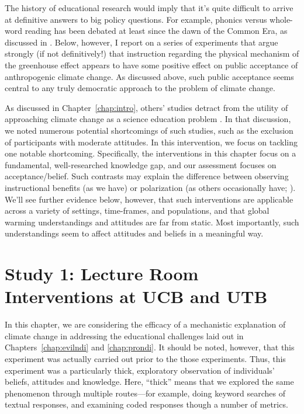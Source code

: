 The history of educational research would imply that it’s quite difficult to
arrive at definitive answers to big policy questions. For example, phonics
versus
whole-word reading has been debated at least since the dawn of the Common Era,
as discussed in \textcite{compayre_history_1889}. Below, however, I report
on a series of experiments that argue strongly (if not definitively!) that
instruction regarding the physical mechanism of the greenhouse effect appears to
have some positive effect on public acceptance of anthropogenic climate change.
As discussed above, such public acceptance seems central to any truly democratic
approach to the problem of climate change.

As discussed in Chapter~\ref{chap:intro}, others’ studies detract from the
utility of approaching climate change as a science education problem
\parencite[e.g.,]{lord_biased_1979,kahan_polarizing_2012}. In that discussion,
we noted numerous potential shortcomings of such studies, such as the exclusion
of participants with moderate attitudes. In this intervention, we focus on
tackling one notable shortcoming. Specifically, the interventions in this chapter 
focus on a fundamental, well-researched knowledge gap, and our assessment
focuses on acceptance/belief.  Such contrasts may explain the difference between
observing instructional benefits (as we have) or polarization (as others
occasionally have; ).  We'll see further evidence
below, however, that such interventions are applicable across a variety of
settings, time-frames, and populations, and that global warming understandings
and attitudes are far from static. Most importantly, such understandings seem to
affect attitudes and beliefs in a meaningful way.


\section{Study 1: Lecture Room Interventions at UCB and UTB}
\label{sec:mech-classroom}

In this chapter, we are considering the efficacy of a mechanistic explanation of
climate change in addressing the educational challenges laid out in
Chapters~\ref{chap:evilndi} and \ref{chap:prondi}. It should be noted, however,
that this experiment was actually carried out prior to the those experiments.
Thus, this experiment was a particularly thick, exploratory observation of
individuals' beliefs, attitudes and knowledge. Here, “thick” means that we
explored the same phenomenon through multiple routes---for example, doing keyword
searches of textual responses, and examining coded responses though a number of
metrics. 

